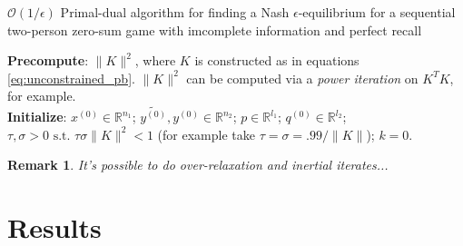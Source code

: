 \documentclass{article} %
\newtheorem{remark}{Remark}
\begin{document}
\begin{algorithm}[H]
  \caption{$\mathcal{O}(1/\epsilon)$ Primal-dual algorithm for finding a Nash $\epsilon$-equilibrium for a sequential two-person zero-sum game with imcomplete information and perfect recall}
  \textbf{Precompute}: $\|K\|^2$, where $K$ is constructed as in equations \eqref{eq:unconstrained_pb}. $\|K\|^2$ can be computed via a \textit{power iteration} on $K^TK$, for example.\\
  \textbf{Initialize}:
  $x^{(0)} \in \mathbb{R}^{n_1}$; $\tilde{y^{(0)}}, y^{(0)} \in \mathbb{R}^{n_2}$; $p \in \mathbb{R}^{l_1}$; $q^{(0)} \in \mathbb{R}^{l_2}$; 
  $\tau, \sigma > 0 \text{ s.t. }\tau\sigma \|K\|^2 < 1$ (for example take $\tau = \sigma = .99/\|K\|$); $k = 0$.\\
  \label{Tab:algo_simplified}
\end{algorithm}

\begin{remark}
It's possible to do over-relaxation and inertial iterates...
\end{remark}

\section{Results}
\end{document}
